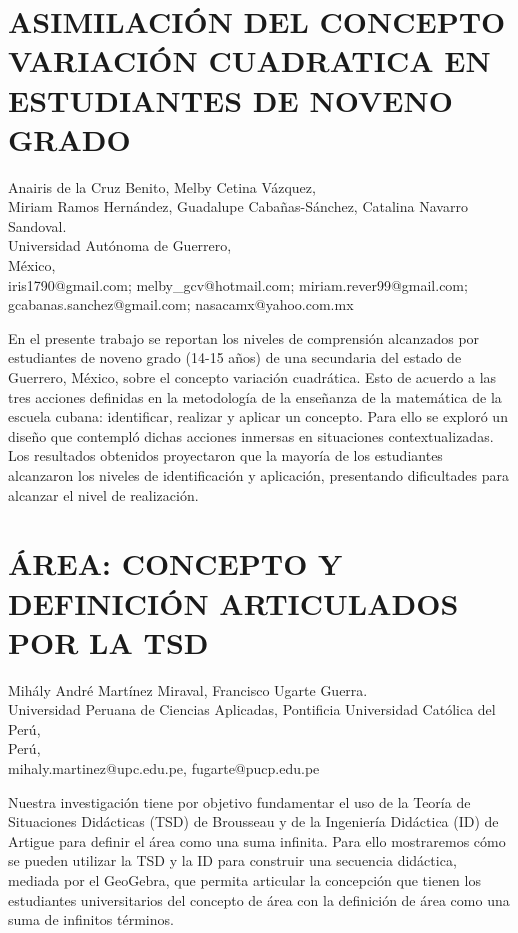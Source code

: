 \section{ASIMILACIÓN DEL CONCEPTO VARIACIÓN CUADRATICA EN ESTUDIANTES DE NOVENO
GRADO }

\begin{datos}
Anairis de la Cruz Benito, Melby Cetina Vázquez, \\
Miriam Ramos Hernández, Guadalupe Cabañas-Sánchez, Catalina Navarro Sandoval.\\
 Universidad Autónoma de Guerrero, \\
\hfill México, \\
\hfill iris1790@gmail.com; melby\_{}gcv@hotmail.com; miriam.rever99@gmail.com; \\ 
\hfill gcabanas.sanchez@gmail.com; nasacamx@yahoo.com.mx   
\end{datos}

En el presente trabajo se reportan los niveles de comprensión alcanzados
por estudiantes de noveno grado (14-15 años) de una secundaria del
estado de Guerrero, México, sobre el concepto variación cuadrática.
Esto de acuerdo a las tres acciones definidas en la metodología de
la enseñanza de la matemática de la escuela cubana: identificar, realizar
y aplicar un concepto. Para ello se exploró un diseño que contempló
dichas acciones inmersas en situaciones contextualizadas. Los resultados
obtenidos proyectaron que la mayoría de los estudiantes alcanzaron
los niveles de identificación y aplicación, presentando dificultades
para alcanzar el nivel de realización.


\section{ÁREA: CONCEPTO Y DEFINICIÓN ARTICULADOS POR LA TSD}

\begin{datos}
Mihály André Martínez Miraval, Francisco Ugarte Guerra. \\
Universidad Peruana de Ciencias Aplicadas, Pontificia Universidad Católica del Perú, \\
\hfill Perú, \\
\hfill mihaly.martinez@upc.edu.pe, fugarte@pucp.edu.pe   
\end{datos}

Nuestra investigación tiene por objetivo fundamentar el uso de la
Teoría de Situaciones Didácticas (TSD) de Brousseau y de la Ingeniería
Didáctica (ID) de Artigue para definir el área como una suma infinita.
Para ello mostraremos cómo se pueden utilizar la TSD y la ID para
construir una secuencia didáctica, mediada por el GeoGebra, que permita
articular la concepción que tienen los estudiantes universitarios
del concepto de área con la definición de área como una suma de infinitos
términos.

